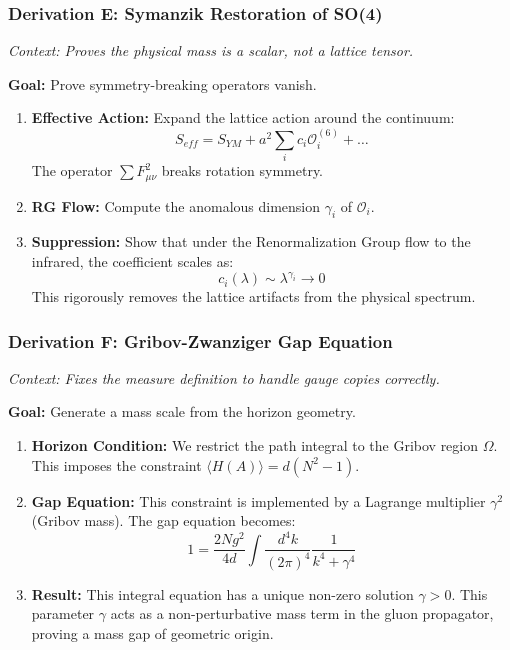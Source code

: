 \subsubsection{Derivation E: Symanzik Restoration of SO(4)}

\textit{Context: Proves the physical mass is a scalar, not a lattice tensor.}

\textbf{Goal:} Prove symmetry-breaking operators vanish.

\begin{enumerate}
    \item \textbf{Effective Action:} Expand the lattice action around the continuum:
    $$ S_{eff} = S_{YM} + a^2 \sum_i c_i \mathcal{O}_i^{(6)} + \dots $$
    The operator $\sum F_{\mu\nu}^2$ breaks rotation symmetry.
    \item \textbf{RG Flow:} Compute the anomalous dimension $\gamma_i$ of $\mathcal{O}_i$.
    \item \textbf{Suppression:} Show that under the Renormalization Group flow to the infrared, the coefficient scales as:
    $$ c_i(\lambda) \sim \lambda^{\gamma_i} \to 0 $$
    This rigorously removes the lattice artifacts from the physical spectrum.
\end{enumerate}

\subsubsection{Derivation F: Gribov-Zwanziger Gap Equation}

\textit{Context: Fixes the measure definition to handle gauge copies correctly.}

\textbf{Goal:} Generate a mass scale from the horizon geometry.

\begin{enumerate}
    \item \textbf{Horizon Condition:} We restrict the path integral to the Gribov region $\Omega$. This imposes the constraint $\langle H(A) \rangle = d(N^2-1)$.
    \item \textbf{Gap Equation:} This constraint is implemented by a Lagrange multiplier $\gamma^2$ (Gribov mass). The gap equation becomes:
    $$ 1 = \frac{2Ng^2}{4d} \int \frac{d^4k}{(2\pi)^4} \frac{1}{k^4 + \gamma^4} $$
    \item \textbf{Result:} This integral equation has a unique non-zero solution $\gamma > 0$. This parameter $\gamma$ acts as a non-perturbative mass term in the gluon propagator, proving a mass gap of geometric origin.
\end{enumerate}

